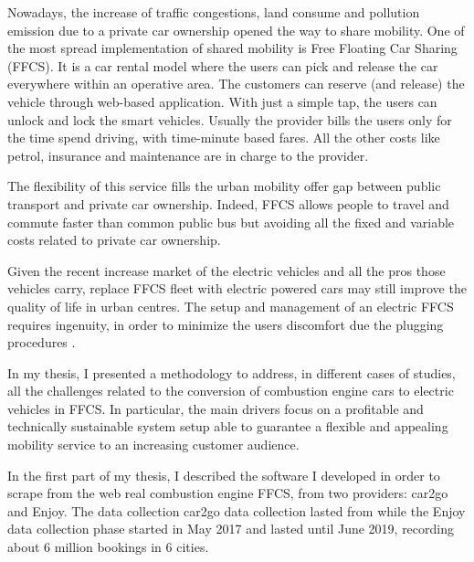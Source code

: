 \documentclass[%
   corpo=12pt, %
   oneside, %
   tipotesi=scudo,
   mybibliostyle, %
  numerazioneromana, %
   ]{toptesi}
\newcommand{\mc}[1]{{\color{purple}{[mike: #1]}}}
\begin{document}
\summary%
Nowadays, the increase of traffic congestions, land consume and pollution emission due to a private car ownership opened the way to share mobility. One of the most spread implementation of shared mobility is Free Floating Car Sharing (FFCS). It is a car rental model where the users can pick and release the car everywhere within an operative area. The customers can reserve (and release) the vehicle through web-based application. With just a simple tap, the users can unlock and lock the smart vehicles. Usually the provider bills the users only for the time spend driving, with time-minute based fares. All the other costs like petrol, insurance and maintenance are in charge to the provider. 

The flexibility of this service fills the urban mobility offer gap between public transport and private car ownership. Indeed, FFCS allows people to travel and commute faster than common public bus but avoiding all the fixed and variable costs related to private car ownership.

Given the recent increase market of the electric vehicles and all the pros those vehicles carry, replace FFCS fleet with electric powered cars may still improve the quality of life in urban centres. The setup and management of an electric FFCS requires ingenuity, in order to minimize the users discomfort due the plugging procedures .

In my thesis, I presented a methodology to address, in different cases of studies, all the challenges related to the conversion of combustion engine cars to electric vehicles in FFCS. In particular, the main drivers focus on a profitable and technically sustainable system setup able to guarantee a flexible and appealing mobility service to an increasing customer audience.

In the first part of my thesis, I described the software I developed in order to scrape from the web real combustion engine FFCS, from two providers: car2go and Enjoy. The data collection car2go data collection lasted from \mc{december 2016 to january 2018, collecting more than 27 million users' bookings spread in 23 cities} while the Enjoy data collection phase started in May 2017 and lasted until June 2019, recording about 6 million bookings in 6 cities. 
\end{document}

